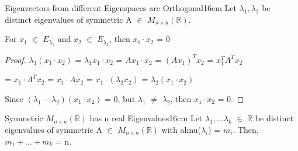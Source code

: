     \vspace{0.5cm}



    \begin{wtheorem}{Eigenvectors from different Eigenspaces are Orthogonal}{16cm}
        Let $\lambda_1,\lambda_2$ be distinct eigenvalues of
        symmetric A $\in$ $M_{n \times n}(\mathbb{R})$.

        For $x_1$ $\in$ $E_{\lambda_1}$ and $x_2$ $\in$ $E_{\lambda_2}$,
        then $x_1 \cdot x_2$ = 0
    \end{wtheorem}

    \begin{proof}
        $\lambda_1(x_1 \cdot x_2)$
        = $\lambda_1x_1 \cdot x_2$
        = $Ax_1 \cdot x_2$
        = $(Ax_1)^Tx_2$
        = $x_1^TA^Tx_2$

        \hspace{1.8cm}
        = $x_1 \cdot A^Tx_2$
        = $x_1 \cdot Ax_2$
        = $x_1 \cdot (\lambda_2x_2)$
        = $\lambda_2(x_1 \cdot x_2)$

        Since $(\lambda_1-\lambda_2)(x_1 \cdot x_2)$ = 0,
        but $\lambda_1$ $\not =$ $\lambda_2$, then $x_1 \cdot x_2$ = 0.
    \end{proof}

    \newpage



    \begin{wtheorem}{Symmetric $M_{n \times n}(\mathbb{R})$ has n
    real Eigenvalues}{16cm}
        Let $\lambda_1,...\lambda_k$ $\in$ $\mathbb{R}$ be distinct
        eigenvalues of symmetric A $\in$ $M_{n \times n}(\mathbb{R})$
        with almu($\lambda_i$) = $m_i$. Then, $m_1 + ... + m_k$ = n.
    \end{wtheorem}

